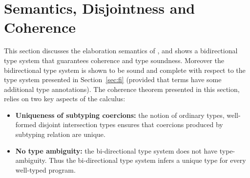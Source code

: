 \section{Semantics, Disjointness and Coherence}
\label{sec:disjoint}
This section discusses the elaboration semantics of \name, and shows a
bidirectional type system that guarantees coherence and type
soundness. Moreover the bidirectional type system is shown to be sound
and complete with respect to the type system presented in
Section~\ref{sec:fi} (provided that terms have some additional type
annotations). 
The coherence theorem presented in this section, relies on two key
aspects of the calculus:

\begin{itemize}

\item {\bf Uniqueness of subtyping coercions:} the notion of ordinary
  types, well-formed disjoint intersection types ensures that
  coercions produced by subtyping relation are unique.

\item {\bf No type ambiguity:} the bi-directional type system does not
  have type-ambiguity. Thus the bi-directional type system infers a
  unique type for every well-typed program. 


\end{itemize}

%
%
%


